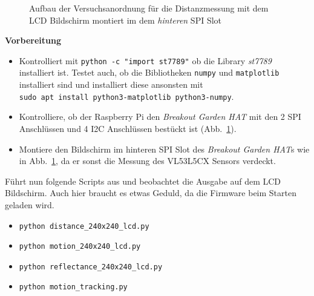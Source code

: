 \documentclass[
  11pt,
  a4paperpaper,
  oneside, openany  ,captions=tableheading
]{scrbook}
\providecommand{\tightlist}{%
  \setlength{\itemsep}{0pt}\setlength{\parskip}{0pt}}
\theoremstyle{definition}
\theoremstyle{remark}
\begin{document}
\begin{figure}


\caption{\label{fig-vl53l5cx-LCD}Aufbau der Versuchsanordnung für die
Distanzmessung mit dem LCD Bildschirm montiert im dem \emph{hinteren}
SPI Slot}

\end{figure}%

\textbf{Vorbereitung}

\begin{itemize}
\tightlist
\item
  Kontrolliert mit \texttt{python\ -c\ "import\ st7789"} ob die Library
  \emph{st7789} installiert ist. Testet auch, ob die Bibliotheken
  \texttt{numpy} und \texttt{matplotlib} installiert sind und
  installiert diese ansonsten mit
  \texttt{sudo\ apt\ install\ python3-matplotlib\ python3-numpy}.
\item
  Kontrolliere, ob der Raspberry Pi den \emph{Breakout Garden HAT} mit
  den 2 SPI Anschlüssen und 4 I2C Anschlüssen bestückt ist
  (Abb.~\ref{fig-vl53l5cx-LCD}).
\item
  Montiere den Bildschirm im hinteren SPI Slot des \emph{Breakout Garden
  HAT}s wie in Abb.~\ref{fig-vl53l5cx-LCD}, da er sonst die Messung des
  VL53L5CX Sensors verdeckt.
\end{itemize}

Führt nun folgende Scripts aus und beobachtet die Ausgabe auf dem LCD
Bildschirm. Auch hier braucht es etwas Geduld, da die Firmware beim
Starten geladen wird.

\begin{itemize}
\tightlist
\item
  \texttt{python\ distance\_240x240\_lcd.py}
\item
  \texttt{python\ motion\_240x240\_lcd.py}
\item
  \texttt{python\ reflectance\_240x240\_lcd.py}
\item
  \texttt{python\ motion\_tracking.py}
\end{itemize}
\end{document}
